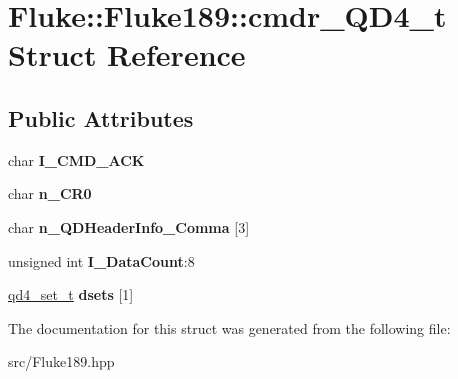 \hypertarget{structFluke_1_1Fluke189_1_1cmdr__QD4__t}{
\section{Fluke::Fluke189::cmdr\_\-QD4\_\-t Struct Reference}
\label{structFluke_1_1Fluke189_1_1cmdr__QD4__t}
}
\subsection*{Public Attributes}
\begin{DoxyCompactItemize}
\item 
\hypertarget{structFluke_1_1Fluke189_1_1cmdr__QD4__t_aa18ec78c1a82952fc5fa36c41b278902}{
char {\bfseries I\_\-CMD\_\-ACK}}
\label{structFluke_1_1Fluke189_1_1cmdr__QD4__t_aa18ec78c1a82952fc5fa36c41b278902}

\item 
\hypertarget{structFluke_1_1Fluke189_1_1cmdr__QD4__t_a556b63099f587c3f03ab639394d787af}{
char {\bfseries n\_\-CR0}}
\label{structFluke_1_1Fluke189_1_1cmdr__QD4__t_a556b63099f587c3f03ab639394d787af}

\item 
\hypertarget{structFluke_1_1Fluke189_1_1cmdr__QD4__t_a96d95cc882250e4f46c6a8a7e99d3abf}{
char {\bfseries n\_\-QDHeaderInfo\_\-Comma} \mbox{[}3\mbox{]}}
\label{structFluke_1_1Fluke189_1_1cmdr__QD4__t_a96d95cc882250e4f46c6a8a7e99d3abf}

\item 
\hypertarget{structFluke_1_1Fluke189_1_1cmdr__QD4__t_a30efa6785e158b207d299cf6ea4fe6e6}{
unsigned int {\bfseries I\_\-DataCount}:8}
\label{structFluke_1_1Fluke189_1_1cmdr__QD4__t_a30efa6785e158b207d299cf6ea4fe6e6}

\item 
\hypertarget{structFluke_1_1Fluke189_1_1cmdr__QD4__t_a52046440888a475d2872ed934bdf9bdd}{
\hyperlink{structFluke_1_1Fluke189_1_1qd4__set__t}{qd4\_\-set\_\-t} {\bfseries dsets} \mbox{[}1\mbox{]}}
\label{structFluke_1_1Fluke189_1_1cmdr__QD4__t_a52046440888a475d2872ed934bdf9bdd}

\end{DoxyCompactItemize}


The documentation for this struct was generated from the following file:\begin{DoxyCompactItemize}
\item 
src/Fluke189.hpp\end{DoxyCompactItemize}
